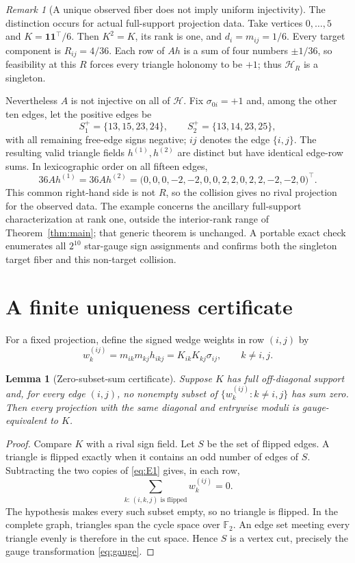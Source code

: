 \documentclass[11pt,a4paper]{article}
\newtheorem{lemma}[theorem]{Lemma}
\theoremstyle{definition}
\theoremstyle{remark}
\newtheorem{remark}[theorem]{Remark}
\begin{document}
\begin{remark}[A unique observed fiber does not imply uniform injectivity]
The distinction occurs for actual full-support projection data.
Take vertices $0,\ldots,5$ and $K=\mathbf 1\mathbf 1^\top/6$.
Then $K^2=K$, its rank is one, and $d_i=m_{ij}=1/6$.
Every target component is $R_{ij}=4/36$.
Each row of $Ah$ is a sum of four numbers $\pm1/36$, so feasibility at this $R$
forces every triangle holonomy to be $+1$; thus $\mathcal H_R$ is a singleton.

Nevertheless $A$ is not injective on all of $\mathcal H$.
Fix $\sigma_{0i}=+1$ and, among the other ten edges, let the positive edges be
\[
 S_1^+=\{13,15,23,24\},\qquad S_2^+=\{13,14,23,25\},
\]
with all remaining free-edge signs negative; $ij$ denotes the edge $\{i,j\}$.
The resulting valid triangle fields $h^{(1)},h^{(2)}$ are distinct but have identical
edge-row sums. In lexicographic order on all fifteen edges,
\[
36Ah^{(1)}=36Ah^{(2)}
 =\big(0,0,0,-2,-2,0,0,2,2,0,2,2,-2,-2,0\big)^\top.
\]
This common right-hand side is not $R$, so the collision gives no rival projection
for the observed data.
The example concerns the ancillary full-support characterization at rank one,
outside the interior-rank range of Theorem~\ref{thm:main}; that generic theorem is unchanged.
A portable exact check enumerates all $2^{10}$ star-gauge sign assignments and confirms
both the singleton target fiber and this non-target collision.
\end{remark}

\section{A finite uniqueness certificate}

For a fixed projection, define the signed wedge weights in row $(i,j)$ by
\begin{equation}
 w_k^{(ij)}=m_{ik}m_{kj}h_{ikj}=K_{ik}K_{kj}\sigma_{ij},\qquad k\ne i,j.
 \label{eq:w}
\end{equation}

\begin{lemma}[Zero-subset-sum certificate]\label{lem:zss}
Suppose $K$ has full off-diagonal support and, for every edge $(i,j)$, no nonempty subset
of $\{w_k^{(ij)}:k\ne i,j\}$ has sum zero.  Then every projection with the same diagonal
and entrywise moduli is gauge-equivalent to $K$.
\end{lemma}

\begin{proof}
Compare $K$ with a rival sign field.  Let $S$ be the set of flipped edges.  A triangle is
flipped exactly when it contains an odd number of edges of $S$.  Subtracting the two copies
of \eqref{eq:E1} gives, in each row,
\[
 \sum_{k:\,(i,k,j)\text{ is flipped}}w_k^{(ij)}=0.
\]
The hypothesis makes every such subset empty, so no triangle is flipped.  In the complete
graph, triangles span the cycle space over $\mathbb F_2$.  An edge set meeting every
triangle evenly is therefore in the cut space.  Hence $S$ is a vertex cut, precisely the
gauge transformation \eqref{eq:gauge}.
\end{proof}
\end{document}

